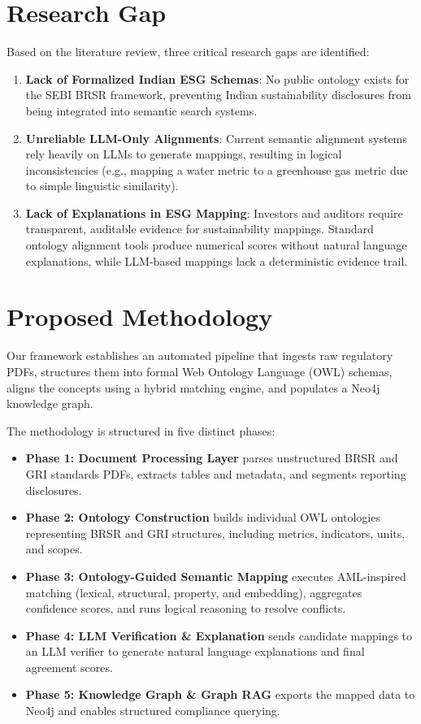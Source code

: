 \documentclass[journal,compsoc]{IEEEtran}
\begin{document}
\section{Research Gap}
Based on the literature review, three critical research gaps are identified:
\begin{enumerate}
    \item \textbf{Lack of Formalized Indian ESG Schemas}: No public ontology exists for the SEBI BRSR framework, preventing Indian sustainability disclosures from being integrated into semantic search systems.
    \item \textbf{Unreliable LLM-Only Alignments}: Current semantic alignment systems rely heavily on LLMs to generate mappings, resulting in logical inconsistencies (e.g., mapping a water metric to a greenhouse gas metric due to simple linguistic similarity).
    \item \textbf{Lack of Explanations in ESG Mapping}: Investors and auditors require transparent, auditable evidence for sustainability mappings. Standard ontology alignment tools produce numerical scores without natural language explanations, while LLM-based mappings lack a deterministic evidence trail.
\end{enumerate}

\section{Proposed Methodology}
Our framework establishes an automated pipeline that ingests raw regulatory PDFs, structures them into formal Web Ontology Language (OWL) schemas, aligns the concepts using a hybrid matching engine, and populates a Neo4j knowledge graph.

The methodology is structured in five distinct phases:
\begin{itemize}
    \item \textbf{Phase 1: Document Processing Layer} parses unstructured BRSR and GRI standards PDFs, extracts tables and metadata, and segments reporting disclosures.
    \item \textbf{Phase 2: Ontology Construction} builds individual OWL ontologies representing BRSR and GRI structures, including metrics, indicators, units, and scopes.
    \item \textbf{Phase 3: Ontology-Guided Semantic Mapping} executes AML-inspired matching (lexical, structural, property, and embedding), aggregates confidence scores, and runs logical reasoning to resolve conflicts.
    \item \textbf{Phase 4: LLM Verification \& Explanation} sends candidate mappings to an LLM verifier to generate natural language explanations and final agreement scores.
    \item \textbf{Phase 5: Knowledge Graph \& Graph RAG} exports the mapped data to Neo4j and enables structured compliance querying.
\end{itemize}
\end{document}
